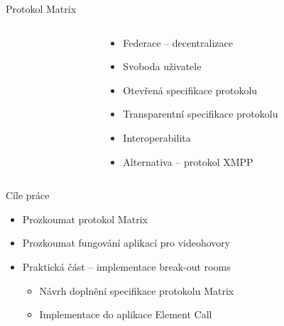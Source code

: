 \documentclass[aspectratio=169]{beamer}
\begin{document}
\begin{frame}{Protokol Matrix}
    \pause
    \begin{columns}
        \begin{column}{0.5\textwidth}
            \centering
        \end{column}
        \begin{column}{0.5\textwidth}
            \begin{itemize}[<+->]
                \item Federace -- decentralizace
                \item Svoboda uživatele
                \item Otevřená specifikace protokolu
                \item Transparentní specifikace protokolu
                \item Interoperabilita
                \item Alternativa -- protokol XMPP
            \end{itemize}
        \end{column}
    \end{columns}
\end{frame}
\begin{frame}{Cíle práce}
    \pause
    \begin{itemize}[<+->]
        \item Prozkoumat protokol Matrix
        \item Prozkoumat fungování aplikací pro videohovory
        \item Praktická část -- implementace break-out rooms
              \begin{itemize}
                  \item Návrh doplnění specifikace protokolu Matrix
                  \item Implementace do aplikace Element Call
              \end{itemize}
    \end{itemize}
\end{frame}
\end{document}
